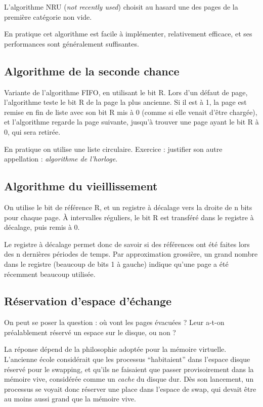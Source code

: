 \begin{multicols}{2}
L'algorithme NRU ({\em not recently used}) choisit au hasard une des
pages de la  première catégorie non vide.

En pratique cet algorithme est facile à implémenter, relativement efficace,
et ses performances sont généralement suffisantes.



\subsection{Algorithme de la seconde chance}

Variante de l'algorithme FIFO, en utilisant le bit R. Lors d'un défaut
de page, l'algorithme teste le bit R de la page la plus ancienne. Si
il est à 1, la page est remise en fin de liste avec son bit R mis à 0
(comme si elle venait d'être chargée), et l'algorithme regarde la page
suivante, jusqu'à trouver une page ayant le bit R à 0, qui sera
retirée.

En pratique on utilise une liste circulaire. Exercice : justifier
son autre appellation : {\em algorithme de l'horloge}.


\subsection{Algorithme du vieillissement}

On utilise le bit de référence R, et un registre à décalage 
vers la droite de n bits pour chaque page.
À intervalles réguliers, le bit R est transféré dans le registre
à décalage, puis remis à 0.

Le registre à décalage permet donc de savoir si des références ont
été faites lors des n dernières périodes de temps. Par approximation
grossière, un grand nombre dans le registre (beaucoup de bits 1 à gauche)
indique qu'une page a été récemment beaucoup utilisée.


\subsection{Réservation d'espace d'échange}

On peut se poser la question : où vont les pages évacuées ? 
Leur a-t-on préalablement réservé un espace sur le disque, ou non ?


La réponse dépend de la philosophie adoptée pour la mémoire
virtuelle. L'ancienne école considérait que les processus
``habitaient'' dans l'espace disque réservé pour le swapping, et
qu'ils ne faisaient que passer provisoirement dans la mémoire vive,
considérée comme un {\em cache} du disque dur.  Dès son lancement, un
processus se voyait donc réserver une place dans l'espace de swap, qui
devait être au moins aussi grand que la mémoire vive.


\end{multicols}
